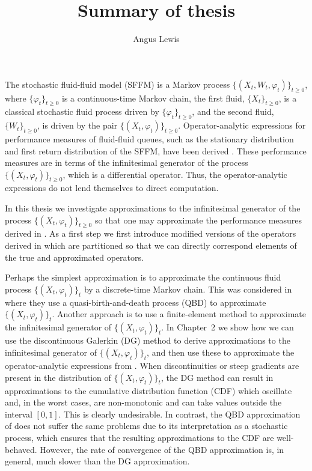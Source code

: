 \documentclass[a4paper]{article}
\title{Summary of thesis}
\author{Angus Lewis}
\begin{document}
\maketitle
The stochastic fluid-fluid model (SFFM) is a Markov process {\(\{(X_t,W_t,\varphi_t)\}_{t\geq 0}\),} where {\(\{\varphi_t\}_{t\geq 0}\)} is a continuous-time Markov chain, the first fluid, {\(\{X_t\}_{t\geq 0}\),} is a classical stochastic fluid process driven by {\(\{\varphi_t\}_{t\geq0}\),} and the second fluid, {\(\{W_t\}_{t\geq0}\),} is driven by the pair {\(\{(X_t,\varphi_t)\}_{t\geq 0}\).} Operator-analytic expressions for performance measures of fluid-fluid queues, such as the stationary distribution and first return distribution of the SFFM, have been derived \cite{bo2014}. These performance measures are in terms of the infinitesimal generator of the process {\(\{(X_t,\varphi_t)\}_{t\geq 0}\)}, which is a differential operator. Thus, the operator-analytic expressions do not lend themselves to direct computation. 

In this thesis we investigate approximations to the infinitesimal generator of the process {\(\{(X_t,\varphi_t)\}_{t\geq 0}\)} so that one may approximate the performance measures derived in \cite{bo2014}. As a first step we first introduce modified versions of the operators derived in \cite{bo2014} which are partitioned so that we can directly correspond elements of the true and approximated operators.

Perhaps the simplest approximation is to approximate the continuous fluid process \(\{(X_t,\varphi_t)\}_t\) by a discrete-time Markov chain. This was considered in \cite{bo2013} where they use a quasi-birth-and-death process (QBD) to approximate \(\{(X_t,\varphi_t)\}_t\). Another approach is to use a finite-element method to approximate the infinitesimal generator of \(\{(X_t,\varphi_t)\}_t\). In Chapter~2 we show how we can use the discontinuous Galerkin (DG) method to derive approximations to the infinitesimal generator of \(\{(X_t,\varphi_t)\}_t\), and then use these to approximate the operator-analytic expressions from \cite{bo2014}. When discontinuities or steep gradients are present in the distribution of \(\{(X_t,\varphi_t)\}_t\), the DG method can result in approximations to the cumulative distribution function (CDF) which oscillate and, in the worst cases, are non-monotonic and can take values outside the interval \([0,1]\). This is clearly undesirable. In contrast, the QBD approximation of \cite{bo2013} does not suffer the same problems due to its interpretation as a stochastic process, which ensures that the resulting approximations to the CDF are well-behaved. However, the rate of convergence of the QBD approximation is, in general, much slower than the DG approximation.
\end{document}
